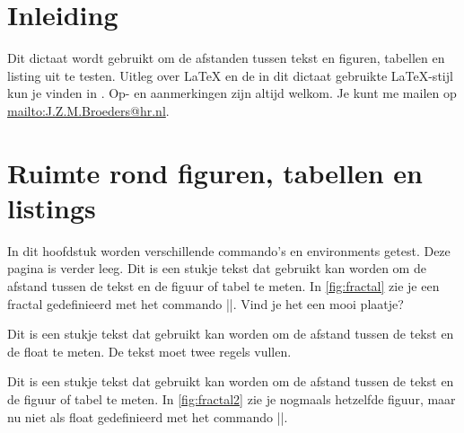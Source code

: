
\newcommand{\myClass}{book}
\newcommand{\modulecode}{TST10}
\newcommand{\titel}{Figuren, tabellen en listings}
\newcommand{\documenttype}{Dictaat}
\newcommand{\huidigeversie}{2.0}
\newcommand{\auteurs}{
    J.Z.M. Broeders
}



\usepackage{lipsum}


\begin{llstShortInline}
\raggedbottom
\frontmatter

\cleardoublepage
\setcounter{tocdepth}{4}
\setcounter{secnumdepth}{4}
\tableofcontents
\cleardoublepage

\mainmatter
\chapter*{Inleiding}
\label{sec:inleiding}
Dit dictaat wordt gebruikt om de afstanden tussen tekst en figuren, tabellen en listing uit te testen.
Uitleg over \LaTeX{} en de in dit dictaat gebruikte \LaTeX{}-stijl kun je vinden in \cite{Broeders2017}.  
Op- en aanmerkingen zijn altijd welkom.
Je kunt me mailen op \url{mailto:J.Z.M.Broeders@hr.nl}.

\chapter{Ruimte rond figuren, tabellen en listings}
In dit hoofdstuk worden verschillende commando's en environments getest.
Deze pagina is verder leeg.
\clearpage 
Dit is een stukje tekst dat gebruikt kan worden om de afstand tussen de tekst en de figuur of tabel te meten. 
In \cref{fig:fractal} zie je een fractal gedefinieerd met het commando |\figuur|. Vind je het een mooi plaatje?


Dit is een stukje tekst dat gebruikt kan worden om de afstand tussen de tekst en de float te meten. 
De tekst moet twee regels vullen.

\clearpage
Dit is een stukje tekst dat gebruikt kan worden om de afstand tussen de tekst en de figuur of tabel te meten. 
In \cref{fig:fractal2} zie je nogmaals hetzelfde figuur, maar nu niet als float gedefinieerd met het commando |\figuur[H]|. 


\end{llstShortInline}
